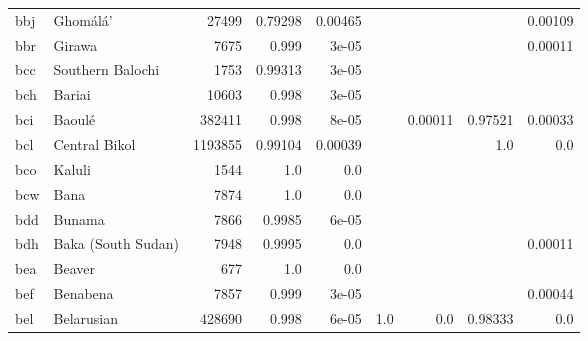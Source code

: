\documentclass[11pt]{article}
\begin{document}
\begin{table*}[ht]
{\begin{tabular}{llrrrrrrr}
bbj         & Ghomálá'         & 27499         & 0.79298         & 0.00465         &          &          &          & 0.00109         \\

bbr         & Girawa         & 7675         & 0.999         & 3e-05         &          &          &          & 0.00011         \\

bcc         & Southern Balochi         & 1753         & 0.99313         & 3e-05         &          &          &          &          \\

bch         & Bariai         & 10603         & 0.998         & 3e-05         &          &          &          &          \\

bci         & Baoulé         & 382411         & 0.998         & 8e-05         &          & 0.00011         & 0.97521         & 0.00033         \\

bcl         & Central Bikol         & 1193855         & 0.99104         & 0.00039         &          &          & 1.0         & 0.0         \\

bco         & Kaluli         & 1544         & 1.0         & 0.0         &          &          &          &          \\

bcw         & Bana         & 7874         & 1.0         & 0.0         &          &          &          &          \\

bdd         & Bunama         & 7866         & 0.9985         & 6e-05         &          &          &          &          \\

bdh         & Baka (South Sudan)         & 7948         & 0.9995         & 0.0         &          &          &          & 0.00011         \\

bea         & Beaver         & 677         & 1.0         & 0.0         &          &          &          &          \\

bef         & Benabena         & 7857         & 0.999         & 3e-05         &          &          &          & 0.00044         \\

bel         & Belarusian         & 428690         & 0.998         & 6e-05         & 1.0         & 0.0         & 0.98333         & 0.0         \\


\end{tabular}}
\end{table*}
\end{document}
